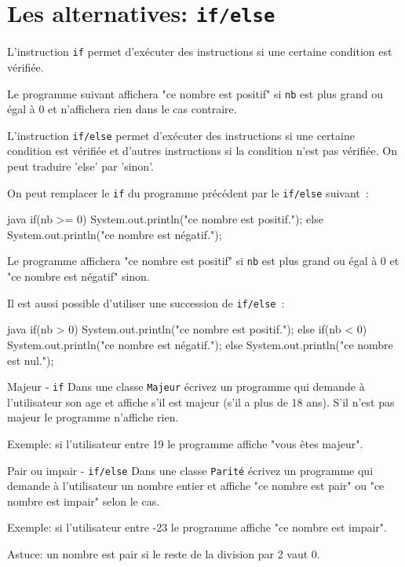 \documentclass[a4paper,11pt]{article}
\begin{document}
\section{Les alternatives: \texttt{if/else}}

	L'instruction \texttt{if} permet d'exécuter des instructions si une certaine condition est vérifiée.
	
	Le programme suivant affichera "ce nombre est positif" 
	si \texttt{nb} est plus grand ou égal à 0 et n'affichera rien dans le cas contraire.
	 

	L'instruction \texttt{if/else} permet d'exécuter des instructions si une certaine condition est vérifiée
	et d'autres instructions si la condition n'est pas vérifiée. On peut traduire 'else' par 'sinon'.
	
	On peut remplacer le \texttt{if} du programme précédent par le \texttt{if/else} suivant~:
	
	\begin{Code}{java}
		if(nb >= 0) {
			System.out.println("ce nombre est positif.");
		} else {
			System.out.println("ce nombre est négatif.");
		}
	\end{Code}

	Le programme affichera "ce nombre est positif" 
	si \texttt{nb} est plus grand ou égal à 0 et "ce nombre est négatif" sinon.


	Il est aussi possible d'utiliser une succession de \texttt{if/else}~:
		
	\begin{Code}{java}
		if(nb > 0) {
			System.out.println("ce nombre est positif.");
		} else if(nb < 0) {
			System.out.println("ce nombre est négatif.");
		} else {
			System.out.println("ce nombre est nul.");
		}
	\end{Code}

	
	\begin{Exercice}{Majeur - \texttt{if}}
		Dans une classe \texttt{Majeur} écrivez un programme qui demande à l'utilisateur 
		son age et affiche s'il est majeur (s'il a plus de 18 ans). 
		S'il n'est pas majeur le programme n'affiche rien.
		
		Exemple: si l'utilisateur entre 19 le programme affiche "vous êtes majeur". 
	\end{Exercice}

	\begin{Exercice}{Pair ou impair - \texttt{if/else}}
		Dans une classe \texttt{Parité} écrivez un programme qui demande à l'utilisateur 
		un nombre entier et affiche "ce nombre est pair" ou "ce nombre est impair" selon le cas.
				
		Exemple: si l'utilisateur entre -23 le programme affiche "ce nombre est impair". 

		Astuce: un nombre est pair si le reste de la division par 2 vaut 0.
	\end{Exercice}
\end{document}
